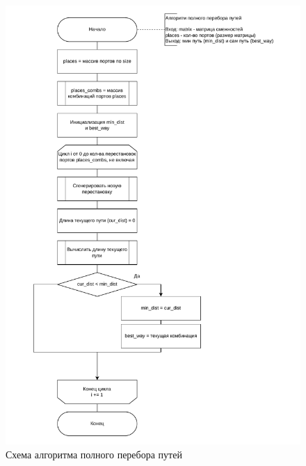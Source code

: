 \begin{figure}[h]
	\centering
	\includegraphics[height=0.8\textheight]{img/full-comb.pdf}
	\caption{Схема алгоритма полного перебора путей}
	\label{fig:full-comb}
\end{figure}


